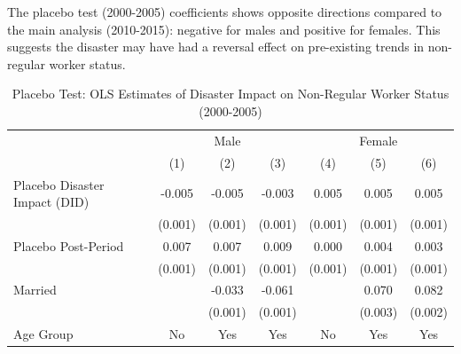 \documentclass[serif, aspectratio=169]{beamer}
\begin{document}
\begin{frame}

The placebo test (2000-2005) coefficients shows opposite directions compared to the main analysis (2010-2015): negative for males and positive for females. This suggests the
disaster may have had a reversal effect on pre-existing trends in non-regular worker status.

\begin{table}[htbp]
\centering
\caption{Placebo Test: OLS Estimates of Disaster Impact on Non-Regular Worker Status (2000-2005)}

\vspace{-0.2cm}


\begin{tabular}{@{}l*{6}{c}@{}}
          &\multicolumn{3}{c}{Male}                                &\multicolumn{3}{c}{Female}                              \\\cmidrule(lr){2-4}\cmidrule(lr){5-7}
          &\multicolumn{1}{c}{(1)}         &\multicolumn{1}{c}{(2)}         &\multicolumn{1}{c}{(3)}         &\multicolumn{1}{c}{(4)}         &\multicolumn{1}{c}{(5)}         &\multicolumn{1}{c}{(6)}         \\
\toprule
Placebo Disaster Impact (DID)&   -0.005\sym{***}&   -0.005\sym{***}&   -0.003\sym{***}&    0.005\sym{***}&    0.005\sym{***}&    0.005\sym{***}\\
          &  (0.001)         &  (0.001)         &  (0.001)         &  (0.001)         &  (0.001)         &  (0.001)         \\
\addlinespace
Placebo Post-Period&    0.007\sym{***}&    0.007\sym{***}&    0.009\sym{***}&    0.000         &    0.004\sym{***}&    0.003\sym{***}\\
          &  (0.001)         &  (0.001)         &  (0.001)         &  (0.001)         &  (0.001)         &  (0.001)         \\
\addlinespace
Married   &                  &   -0.033\sym{***}&   -0.061\sym{***}&                  &    0.070\sym{***}&    0.082\sym{***}\\
          &                  &  (0.001)         &  (0.001)         &                  &  (0.003)         &  (0.002)         \\
\midrule
Age Group       &       No         &      Yes         &      Yes         &       No         &      Yes         &      Yes         \\

\end{tabular}
\end{table}
\end{frame}
\end{document}
